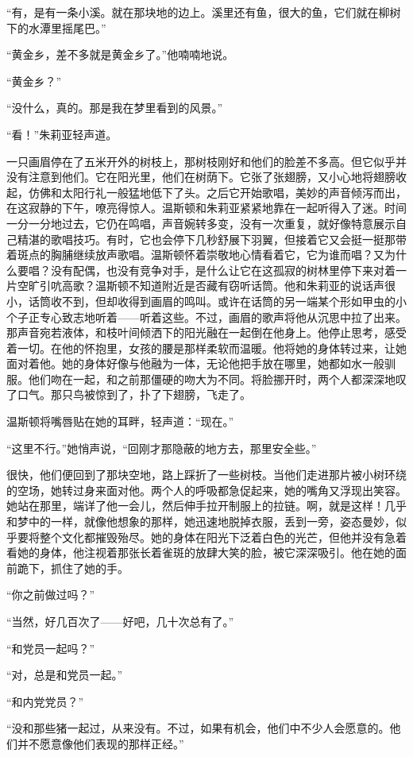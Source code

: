 ``有，是有一条小溪。就在那块地的边上。溪里还有鱼，很大的鱼，它们就在柳树下的水潭里摇尾巴。''

``黄金乡，差不多就是黄金乡了。''他喃喃地说。

``黄金乡？''

``没什么，真的。那是我在梦里看到的风景。''

``看！''朱莉亚轻声道。

一只画眉停在了五米开外的树枝上，那树枝刚好和他们的脸差不多高。但它似乎并没有注意到他们。它在阳光里，他们在树荫下。它张了张翅膀，又小心地将翅膀收起，仿佛和太阳行礼一般猛地低下了头。之后它开始歌唱，美妙的声音倾泻而出，在这寂静的下午，嘹亮得惊人。温斯顿和朱莉亚紧紧地靠在一起听得入了迷。时间一分一分地过去，它仍在鸣唱，声音婉转多变，没有一次重复，就好像特意展示自己精湛的歌唱技巧。有时，它也会停下几秒舒展下羽翼，但接着它又会挺一挺那带着斑点的胸脯继续放声歌唱。温斯顿怀着崇敬地心情看着它，它为谁而唱？又为什么要唱？没有配偶，也没有竞争对手，是什么让它在这孤寂的树林里停下来对着一片空旷引吭高歌？温斯顿不知道附近是否藏有窃听话筒。他和朱莉亚的说话声很小，话筒收不到，但却收得到画眉的鸣叫。或许在话筒的另一端某个形如甲虫的小个子正专心致志地听着——听着这些。不过，画眉的歌声将他从沉思中拉了出来。那声音宛若液体，和枝叶间倾洒下的阳光融在一起倒在他身上。他停止思考，感受着一切。在他的怀抱里，女孩的腰是那样柔软而温暖。他将她的身体转过来，让她面对着他。她的身体好像与他融为一体，无论他把手放在哪里，她都如水一般驯服。他们吻在一起，和之前那僵硬的吻大为不同。将脸挪开时，两个人都深深地叹了口气。那只鸟被惊到了，扑了下翅膀，飞走了。

温斯顿将嘴唇贴在她的耳畔，轻声道：``现在。''

``这里不行。''她悄声说，``回刚才那隐蔽的地方去，那里安全些。''

很快，他们便回到了那块空地，路上踩折了一些树枝。当他们走进那片被小树环绕的空场，她转过身来面对他。两个人的呼吸都急促起来，她的嘴角又浮现出笑容。她站在那里，端详了他一会儿，然后伸手拉开制服上的拉链。啊，就是这样！几乎和梦中的一样，就像他想象的那样，她迅速地脱掉衣服，丢到一旁，姿态曼妙，似乎要将整个文化都摧毁殆尽。她的身体在阳光下泛着白色的光芒，但他并没有急着看她的身体，他注视着那张长着雀斑的放肆大笑的脸，被它深深吸引。他在她的面前跪下，抓住了她的手。

``你之前做过吗？''

``当然，好几百次了——好吧，几十次总有了。''

``和党员一起吗？''

``对，总是和党员一起。''

``和内党党员？''

``没和那些猪一起过，从来没有。不过，如果有机会，他们中不少人会愿意的。他们并不愿意像他们表现的那样正经。''

